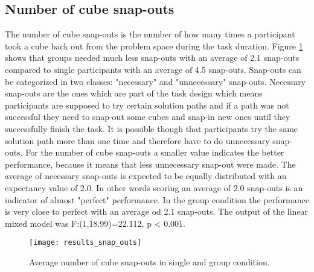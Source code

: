 \subsection{Number of cube snap-outs}
The number of cube snap-outs is the number of how many times a participant took a cube back out from the problem space during the task duration. Figure \ref{fig:results_snap_outs} shows that groups needed much less snap-outs with an average of 2.1 snap-outs compared to single participants with an average of 4.5 snap-outs. 
Snap-outs can be categorized in two classes: "necessary" and "unnecessary" snap-outs. Necessary snap-outs are the ones which are part of the task design which means participants are supposed to try certain solution paths and if a path was not successful they need to snap-out some cubes and snap-in new ones until they successfully finish the task. It is possible though that participants try the same solution path more than one time and therefore have to do unnecessary snap-outs. For the number of cube snap-outs a smaller value indicates the better performance, because it means that less unnecessary snap-out were made. The average of necessary snap-outs is expected to be equally distributed with an expectancy value of 2.0. In other words scoring an average of 2.0 snap-outs is an indicator of almost "perfect" performance. In the group condition the performance is very close to perfect with an average od 2.1 snap-outs.
The output of the linear mixed model was F:(1,18.99)=22.112, p < 0.001.

\begin{figure}[h]
\centering
\texttt{[image: results\_snap\_outs]}
\caption{Average number of cube snap-outs in single and group condition.}
\label{fig:results_snap_outs}
\end{figure}

\newpage